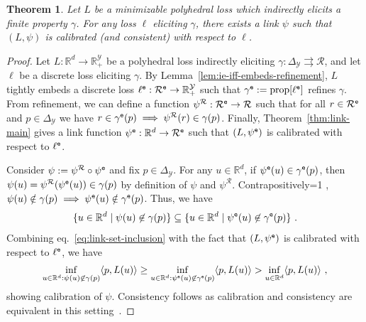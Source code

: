 \documentclass[11pt]{article}
\newcommand{\Comments}{1}
\newcommand{\mytodo}[2]{\ifnum\Comments=1%
  \todo[linecolor=#1!80!black,backgroundcolor=#1,bordercolor=#1!80!black]{#2}\fi}
\newcommand{\raft}[1]{\mytodo{green!20!white}{RF: #1}}
\newcommand{\reals}{\mathbb{R}}
\newcommand{\prop}[1]{\mathrm{prop}[#1]}
\newcommand{\simplex}{\Delta_\Y}
\newcommand{\R}{\mathcal{R}}
\newcommand{\Y}{\mathcal{Y}}
\newcommand{\inprod}[2]{\langle #1, #2 \rangle}%
\newcommand{\toto}{\rightrightarrows}
\newcommand{\emb}{{\tt e}}
\newtheorem{theorem}{Theorem}
\begin{document}
\begin{theorem}\label{thm:poly-ie-implies-consistent}
	Let $L$ be a minimizable polyhedral loss which indirectly elicits a finite property $\gamma$.
  For any loss $\ell$ eliciting $\gamma$, there exists a link $\psi$ such that $(L, \psi)$ is calibrated (and consistent) with respect to $\ell$.
\end{theorem}
\begin{proof}
	Let $L:\reals^d \to \reals^\Y_+$ be a polyhedral loss indirectly eliciting $\gamma: \simplex \toto \R$, and let $\ell$ be a discrete loss eliciting $\gamma$.
  By Lemma~\ref{lem:ie-iff-embeds-refinement}, $L$ tightly embeds a discrete loss $\ell^\emb:\R^\emb\to\reals^\Y_+$ such that $\gamma^\emb := \prop{\ell^\emb}$ refines $\gamma$.
  From refinement, we can define a function $\psi^\R: \R^\emb \to \R$ such that for all $r\in\R^\emb$ and $p\in\simplex$ we have $r\in\gamma^\emb(p) \implies \psi^\R(r) \in \gamma(p)$. 
  Finally, Theorem~\ref{thm:link-main} gives a link function $\psi^\emb : \reals^d \to \R^\emb$ such that $(L,\psi^\emb)$ is calibrated with respect to $\ell^\emb$.

	
  Consider $\psi := \psi^\R \circ \psi^\emb$ and fix $p\in\simplex$.
	For any $u\in\reals^d$, if $\psi^\emb(u) \in \gamma^\emb(p)$, then $\psi(u) = \psi^\R(\psi^\emb(u)) \in \gamma(p)$ by definition of $\psi$ and $\psi^\R$.
  Contrapositively\raft{You heard me},
  $\psi(u) \notin \gamma(p) \implies \psi^\emb(u) \notin \gamma^\emb(p)$.
  Thus, we have
  \begin{equation}
    \label{eq:link-set-inclusion}
    \{u\in\reals^d \mid \psi(u) \not \in \gamma(p) \} \subseteq \{u\in\reals^d \mid \psi^\emb(u) \not \in \gamma^\emb(p) \}~.
  \end{equation}
  Combining eq.~\eqref{eq:link-set-inclusion} with the fact that $(L,\psi^\emb)$ is calibrated with respect to $\ell^\emb$, we have
	\begin{align*}
\inf_{u\in\reals^d : \psi(u) \not \in \gamma(p)} \inprod{p}{L(u)} \geq	\inf_{u\in\reals^d : \psi^\emb(u) \not \in \gamma^\emb(p)} \inprod{p}{L(u)} > \inf_{u\in\reals^d}\inprod{p}{L(u)}~,
	\end{align*}
  showing calibration of $\psi$.
	Consistency follows as calibration and consistency are equivalent in this setting~\citep{ramaswamy2016convex}.
\end{proof}
\end{document}
